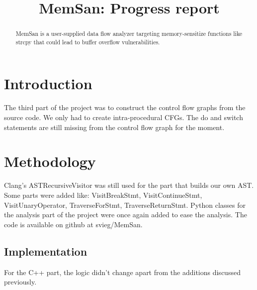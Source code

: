 \documentclass[conference,compsoc]{IEEEtran}
\begin{document}
\title{MemSan: Progress report}

\author{
}

\maketitle
\begin{abstract}
MemSan is a user-supplied data flow analyzer targeting memory-sensitize functions like strcpy that could lead to buffer overflow vulnerabilities.
\end{abstract}

\IEEEpeerreviewmaketitle



\section{Introduction}

The third part of the project was to construct the control flow graphs from the source code. We only had to create intra-procedural CFGs. The do and switch statements are still missing from the control flow graph for the moment.

\section{Methodology}

Clang's ASTRecursiveVisitor was still used for the part
 that builds our own AST. Some parts were added like: VisitBreakStmt,
 VisitContinueStmt, VisitUnaryOperator, TraverseForStmt, TraverseReturnStmt.
 Python classes for the analysis part of the project
 were once again added to ease the analysis.
 The code is available on github at svieg/MemSan.

\subsection{Implementation}

 For the C++ part, the logic didn't change apart from the additions discussed
 previously.
\end{document}
